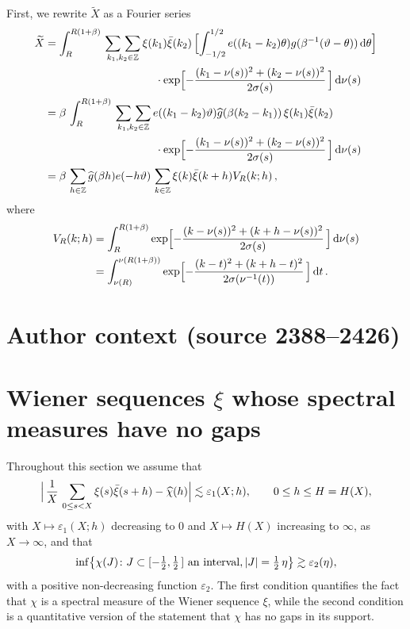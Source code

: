 \documentclass[10pt,a4paper]{amsart}
\newcommand{\bZ}{\mathbb Z}
\def\ep{{\varepsilon}}
\begin{document}
First, we rewrite $\widetilde X$ as a Fourier series
\begin{align*}
\widetilde{X} &=
\int_R^{R(1+\beta)}\, \underset{k_1, k_2\in\bZ}{\sum\, \sum}\, \xi(k_1)\bar\xi(k_2)\,
\Bigl[
\int_{-1/2}^{1/2} e((k_1-k_2)\theta) g(\beta^{-1}(\vartheta-\theta))\, {\rm d}\theta
\Bigr] \\
& \qquad \qquad \qquad \qquad \qquad
\cdot \exp\Bigl[ -\frac{(k_1-\nu(s))^2 + (k_2-\nu(s))^2}{2\sigma(s)}\, \Bigr]\, {\rm d}\nu(s) \\
&= \beta\, \int_R^{R(1+\beta)}\, \underset{k_1, k_2\in\bZ}{\sum\, \sum}\,
e((k_1-k_2)\vartheta) \widehat{g}(\beta(k_2-k_1))\, \xi(k_1)\bar \xi(k_2) \\
& \qquad \qquad \qquad \qquad \qquad
\cdot \exp\Bigl[ -\frac{(k_1-\nu(s))^2 + (k_2-\nu(s))^2}{2\sigma(s)}\, \Bigr]\, {\rm d}\nu(s) \\
&= \beta\,
\sum_{h\in\bZ} \widehat{g}(\beta h) e(-h\vartheta)\,
\sum_{k\in\bZ} \xi(k)\bar\xi(k+h) V_R(k; h)\,,
\end{align*}
where
\begin{align*}
V_R(k; h) &= \int_R^{R(1+\beta)} \exp\Bigl[ -\frac{(k-\nu(s))^2 + (k+h-\nu(s))^2}{2\sigma(s)}\, \Bigr]\, {\rm d}\nu(s) \\
&=
\int_{\nu(R)}^{\nu(R(1+\beta))} \exp\Bigl[ -\frac{(k-t)^2 + (k+h-t)^2}{2\sigma(\nu^{-1}(t))}\, \Bigr]\, {\rm d}t \,.
\end{align*}

\section*{Author context (source 2388--2426)}
\section{Wiener sequences $\xi$ whose spectral measures have no gaps}
\label{sect:8}

Throughout this section we assume that
\begin{equation}\label{eq:C1}
\Bigl|\, \frac1X\, \sum_{0\le s < X} \xi(s)\bar\xi(s+h) - \widehat{\chi}(h) \Bigr|
\lesssim \ep_1(X; h), \qquad 0\le h \le H=H(X),
\end{equation}
with $X\mapsto \ep_1(X; h)$ decreasing to $0$ and $X\mapsto H(X)$ increasing to $\infty$,
as $X\to\infty$, and that
\begin{equation}\label{eq:C2}
\inf\bigl\{\chi(J)\colon
J\subset [-\tfrac12, \tfrac12\,] {\rm\ an\ interval}, |J|=\tfrac12\, \eta\bigr\}
\gtrsim \ep_2(\eta),
\end{equation}
with a positive non-decreasing function $\ep_2$.
The first condition quantifies the fact that $\chi$ is a spectral measure
of the Wiener sequence $\xi$, while the second condition is a quantitative version
of the statement that $\chi$ has no gaps in its support.
\end{document}
